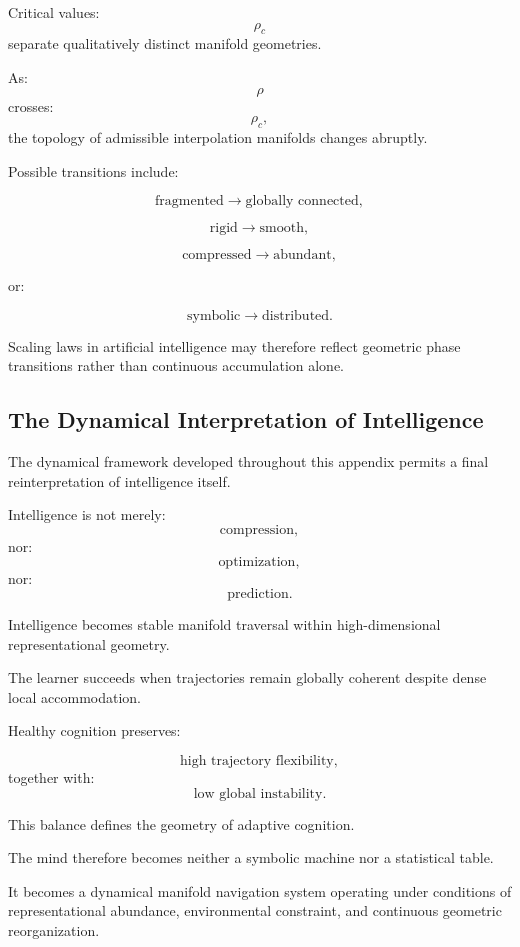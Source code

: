 \documentclass[12pt,a4paper]{article}
\begin{document}
Critical values:
\[
\rho_c
\]
separate qualitatively distinct manifold geometries.

As:
\[
\rho
\]
crosses:
\[
\rho_c,
\]
the topology of admissible interpolation manifolds changes abruptly.

Possible transitions include:

\[
\text{fragmented}
\rightarrow
\text{globally connected},
\]

\[
\text{rigid}
\rightarrow
\text{smooth},
\]

\[
\text{compressed}
\rightarrow
\text{abundant},
\]

or:

\[
\text{symbolic}
\rightarrow
\text{distributed}.
\]

Scaling laws in artificial intelligence may therefore reflect geometric phase transitions rather than continuous accumulation alone.

\subsection{The Dynamical Interpretation of Intelligence}

The dynamical framework developed throughout this appendix permits a final reinterpretation of intelligence itself.

Intelligence is not merely:
\[
\text{compression},
\]
nor:
\[
\text{optimization},
\]
nor:
\[
\text{prediction}.
\]

Intelligence becomes stable manifold traversal within high-dimensional representational geometry.

The learner succeeds when trajectories remain globally coherent despite dense local accommodation.

Healthy cognition preserves:

\[
\text{high trajectory flexibility},
\]
together with:
\[
\text{low global instability}.
\]

This balance defines the geometry of adaptive cognition.

The mind therefore becomes neither a symbolic machine nor a statistical table.

It becomes a dynamical manifold navigation system operating under conditions of representational abundance, environmental constraint, and continuous geometric reorganization.

\end{document}
